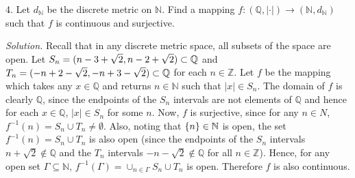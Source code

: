 \documentclass{article}
\newcommand{\N}{\mathbb{N}}
\newcommand{\Q}{\mathbb{Q}}
\newcommand{\Z}{\mathbb{Z}}
\begin{document}
\newpage

4. Let $d_\N$ be the discrete metric on $\N$. Find a mapping $f: (\Q,
   |\cdot|) \to (\N, d_\N)$ such that $f$ is continuous and surjective.

\textit{Solution.}
Recall that in any discrete metric space, all subsets of the space are
open. Let $S_n = \del[0]{n - 3 + \sqrt{2}, n - 2 + \sqrt{2}} \subset \Q$
and $T_n = \del[0]{-n + 2 - \sqrt{2}, -n + 3 - \sqrt{2}} \subset \Q$ for
each $n \in \Z$. Let $f$ be the mapping which takes any $x \in \Q$ and
returns $n \in \N$ such that $|x| \in S_n$. The domain of $f$ is clearly
$\Q$, since the endpoints of the $S_n$ intervals are not elements of
$\Q$ and hence for each $x \in \Q$, $|x| \in S_n$ for some $n$. Now,
$f$ is surjective, since for any $n \in N$, $f^{-1}(n) = S_n \cup T_n
\neq \emptyset$. Also, noting that $\cbr{n} \in \N$ is open, the set
$f^{-1}(n) = S_n \cup T_n$ is also open (since the endpoints of the
$S_n$ intervals $n + \sqrt{2} \not\in \Q$ and the $T_n$ intervals $-n -
\sqrt{2} \not\in \Q$ for all $n \in \Z$). Hence, for any open set
$\Gamma \subseteq \N$, $f^{-1}(\Gamma) = \cup_{n \in \Gamma} S_n \cup
T_n$ is open. Therefore $f$ is also continuous.
\end{document}
